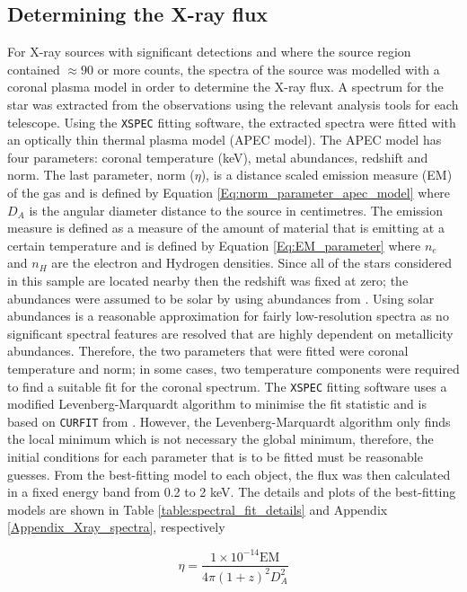 \subsection{Determining the X-ray flux}
\label{Section_Determining_Xray_flux}
For X-ray sources with significant detections and where the source region contained $\approx 90$ or more counts, the spectra of the source was modelled with a coronal plasma model in order to determine the X-ray flux. A spectrum for the star was extracted from the observations using the relevant analysis tools for each telescope. Using the \texttt{XSPEC} fitting software, the extracted spectra were fitted with an optically thin thermal plasma model (APEC model). The APEC model has four parameters: coronal temperature (keV), metal abundances, redshift and norm. The last parameter, norm ($\eta$), is a distance scaled emission measure (EM) of the gas and is defined by Equation \ref{Eq:norm_parameter_apec_model} where $D_{A}$ is the angular diameter distance to the source in centimetres. The emission measure is defined as a measure of the amount of material that is emitting at a certain temperature and is defined by Equation \ref{Eq:EM_parameter} where $n_{e}$ and $n_{H}$ are the electron and Hydrogen densities. Since all of the stars considered in this sample are located nearby then the redshift was fixed at zero; the abundances were assumed to be solar by using abundances from \citet{Grevesse_Sauval_1998}. Using solar abundances is a reasonable approximation for fairly low-resolution spectra as no significant spectral features are resolved that are highly dependent on metallicity abundances. Therefore, the two parameters that were fitted were coronal temperature and norm; in some cases, two temperature components were required to find a suitable fit for the coronal spectrum. The \texttt{XSPEC} fitting software uses a modified Levenberg-Marquardt algorithm to minimise the fit statistic and is based on \texttt{CURFIT} from \citet{Bevington_1969}. However, the Levenberg-Marquardt algorithm only finds the local minimum which is not necessary the global minimum, therefore, the initial conditions for each parameter that is to be fitted must be reasonable guesses. From the best-fitting model to each object, the flux was then calculated in a fixed energy band from 0.2 to 2 keV. The details and plots of the best-fitting models are shown in Table \ref{table:spectral_fit_details} and Appendix \ref{Appendix_Xray_spectra}, respectively

\begin{equation}
    \eta = \frac{1 \times 10^{-14} \text{EM}}{4\pi(1+z)^{2}D_{A}^{2}}
    \label{Eq:norm_parameter_apec_model}
\end{equation}

